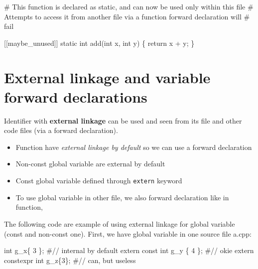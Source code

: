 \documentclass[
  letterpaper,
  DIV=11,
  numbers=noendperiod]{scrreprt}
\newenvironment{Shaded}{\begin{snugshade}}{\end{snugshade}}
\newcommand{\CommentTok}[1]{\textcolor[rgb]{0.37,0.37,0.37}{#1}}
\newcommand{\DecValTok}[1]{\textcolor[rgb]{0.68,0.00,0.00}{#1}}
\newcommand{\FunctionTok}[1]{\textcolor[rgb]{0.28,0.35,0.67}{#1}}
\newcommand{\NormalTok}[1]{\textcolor[rgb]{0.00,0.23,0.31}{#1}}
\newcommand{\SpecialCharTok}[1]{\textcolor[rgb]{0.37,0.37,0.37}{#1}}
\providecommand{\tightlist}{%
  \setlength{\itemsep}{0pt}\setlength{\parskip}{0pt}}\usepackage{longtable,booktabs,array}
\begin{document}
\begin{Shaded}
\begin{Highlighting}[]
\CommentTok{\# This function is declared as static, and can now be used only within this file}
\CommentTok{\# Attempts to access it from another file via a function forward declaration will}
\CommentTok{\# fail}

\NormalTok{[[maybe\_unused]] static int }\FunctionTok{add}\NormalTok{(int x, int y)}
\NormalTok{\{}
\NormalTok{    return x }\SpecialCharTok{+}\NormalTok{ y;}
\NormalTok{\}}
\end{Highlighting}
\end{Shaded}

\hypertarget{external-linkage-and-variable-forward-declarations}{%
\section{External linkage and variable forward
declarations}\label{external-linkage-and-variable-forward-declarations}}

Identifier with \textbf{external linkage} can be used and seen from its
file and other code files (via a forward declaration).

\begin{itemize}
\tightlist
\item
  Function have \emph{external linkage by default} so we can use a
  forward declaration
\item
  Non-const global variable are external by default
\item
  Const global variable defined through \texttt{extern} keyword
\item
  To use global variable in other file, we also forward declaration like
  in function,
\end{itemize}

The following code are example of using external linkage for global
variable (const and non-const one). First, we have global variable in
one source file a.cpp:

\begin{Shaded}
\begin{Highlighting}[]
\NormalTok{int g\_x\{ }\DecValTok{3}\NormalTok{ \};                   }\CommentTok{\#// internal by default}
\NormalTok{extern const int g\_y \{ }\DecValTok{4}\NormalTok{ \};     }\CommentTok{\#// okie}
\NormalTok{extern constexpr int g\_z\{}\DecValTok{3}\NormalTok{\};    }\CommentTok{\#// can, but useless}
\end{Highlighting}
\end{Shaded}
\end{document}
